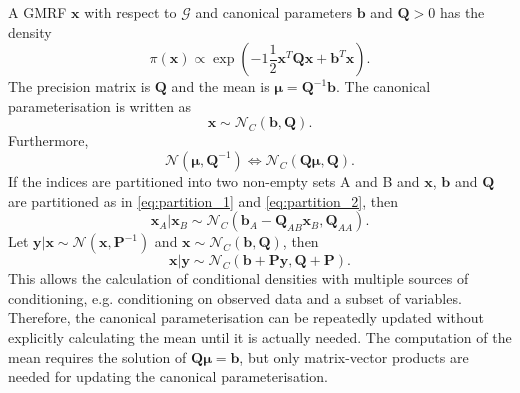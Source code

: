 A GMRF $\pmb{x}$ with respect to $\mathcal{G}$ and canonical parameters $\pmb{b}$ and $\pmb{Q}>0$ has the density
\begin{equation*}
    \pi\left(\pmb{x}\right)\propto\exp\left(-1\frac{1}{2}\pmb{x}^T\pmb{Q}\pmb{x}+\pmb{b}^T\pmb{x}\right).
\end{equation*}
The precision matrix is $\pmb{Q}$ and the mean is $\pmb{\mu}=\pmb{Q}^{-1}\pmb{b}$. The canonical parameterisation is written as 
\begin{equation*}
    \pmb{x}\sim \mathcal{N}_C\left(\pmb{b},\pmb{Q}\right).
\end{equation*}
Furthermore,
\begin{equation*}
    \mathcal{N}\left(\pmb{\mu},\pmb{Q}^{-1}\right) \Longleftrightarrow \mathcal{N}_C\left(\pmb{Q\mu}, \pmb{Q}\right).
\end{equation*}
If the indices are partitioned into two non-empty sets A and B and $\pmb{x}$, $\pmb{b}$ and $\pmb{Q}$ are partitioned as in \eqref{eq:partition_1} and \eqref{eq:partition_2}, then
\begin{equation}
    \pmb{x}_A|\pmb{x}_B\sim\mathcal{N}_C\left(\pmb{b}_A-\pmb{Q}_{AB}\pmb{x}_B,\pmb{Q}_{AA}\right).
\end{equation}
Let $\pmb{y}|\pmb{x}\sim\mathcal{N}\left(\pmb{x},\pmb{P}^{-1}\right)$ and $\pmb{x}\sim\mathcal{N}_C\left(\pmb{b},\pmb{Q}\right)$, then
\begin{equation}
    \pmb{x}|\pmb{y}\sim\mathcal{N}_C\left(\pmb{b}+\pmb{Py}, \pmb{Q}+\pmb{P}\right).
\end{equation}
This allows the calculation of conditional densities with multiple sources of conditioning, e.g. conditioning on observed data and a subset of variables. Therefore, the canonical parameterisation can be repeatedly updated without explicitly calculating the mean until it is actually needed. The computation of the mean requires the solution of $\pmb{Q\mu}=\pmb{b}$, but only matrix-vector products are needed for updating the canonical parameterisation.
